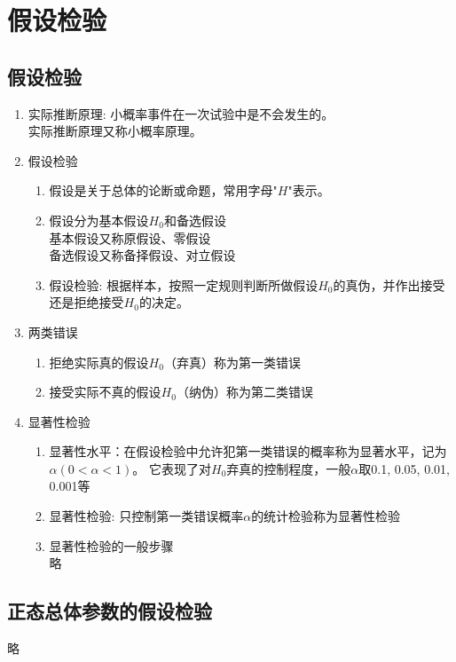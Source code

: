 \section{假设检验}
\subsection{假设检验}
\begin{enumerate}
	\item 实际推断原理: 小概率事件在一次试验中是不会发生的。 \\
	实际推断原理又称小概率原理。
	\item 假设检验
	\begin{enumerate}
		\item 假设是关于总体的论断或命题，常用字母"$H$"表示。
		\item 假设分为基本假设$H_0$和备选假设 \\
		基本假设又称原假设、零假设 \\
		备选假设又称备择假设、对立假设
		\item 假设检验: 根据样本，按照一定规则判断所做假设$H_0$的真伪，并作出接受还是拒绝接受$H_0$的决定。
	\end{enumerate}
	\item 两类错误
	\begin{enumerate}
		\item 拒绝实际真的假设$H_0$（弃真）称为第一类错误
		\item 接受实际不真的假设$H_0$（纳伪）称为第二类错误
	\end{enumerate}
	\item 显著性检验
	\begin{enumerate}
		\item 显著性水平：在假设检验中允许犯第一类错误的概率称为显著水平，记为$\alpha(0<\alpha<1)$。
		它表现了对$H_0$弃真的控制程度，一般$\alpha$取0.1, 0.05, 0.01, 0.001等
		\item 显著性检验: 只控制第一类错误概率$\alpha$的统计检验称为显著性检验
		\item 显著性检验的一般步骤 \\
		略
	\end{enumerate}
\end{enumerate}


\subsection{正态总体参数的假设检验}
略










